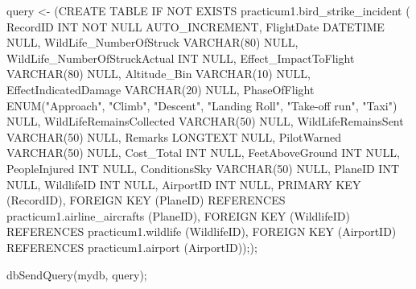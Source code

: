 \documentclass[
]{article}
\newenvironment{Shaded}{\begin{snugshade}}{\end{snugshade}}
\newcommand{\FunctionTok}[1]{\textcolor[rgb]{0.00,0.00,0.00}{#1}}
\newcommand{\NormalTok}[1]{#1}
\newcommand{\OtherTok}[1]{\textcolor[rgb]{0.56,0.35,0.01}{#1}}
\newcommand{\StringTok}[1]{\textcolor[rgb]{0.31,0.60,0.02}{#1}}
\begin{document}
\begin{Shaded}
\begin{Highlighting}[]
\NormalTok{query }\OtherTok{\textless{}{-}}\NormalTok{ (}\StringTok{\textquotesingle{}CREATE TABLE IF NOT EXISTS practicum1.\textasciigrave{}bird\_strike\_incident\textasciigrave{} (}
\StringTok{  \textasciigrave{}RecordID\textasciigrave{} INT NOT NULL AUTO\_INCREMENT,}
\StringTok{  \textasciigrave{}FlightDate\textasciigrave{} DATETIME NULL,}
\StringTok{  \textasciigrave{}WildLife\_NumberOfStruck\textasciigrave{} VARCHAR(80) NULL,}
\StringTok{  \textasciigrave{}WildLife\_NumberOfStruckActual\textasciigrave{} INT NULL,}
\StringTok{  \textasciigrave{}Effect\_ImpactToFlight\textasciigrave{} VARCHAR(80) NULL,}
\StringTok{  \textasciigrave{}Altitude\_Bin\textasciigrave{} VARCHAR(10) NULL,}
\StringTok{  \textasciigrave{}EffectIndicatedDamage\textasciigrave{} VARCHAR(20) NULL,}
\StringTok{  \textasciigrave{}PhaseOfFlight\textasciigrave{} ENUM("Approach", "Climb", "Descent", "Landing Roll", "Take{-}off run", "Taxi") NULL,}
\StringTok{  \textasciigrave{}WildLifeRemainsCollected\textasciigrave{} VARCHAR(50) NULL,}
\StringTok{  \textasciigrave{}WildLifeRemainsSent\textasciigrave{} VARCHAR(50) NULL,}
\StringTok{  \textasciigrave{}Remarks\textasciigrave{} LONGTEXT NULL,}
\StringTok{  \textasciigrave{}PilotWarned\textasciigrave{} VARCHAR(50) NULL,}
\StringTok{  \textasciigrave{}Cost\_Total\textasciigrave{} INT NULL,}
\StringTok{  \textasciigrave{}FeetAboveGround\textasciigrave{} INT NULL,}
\StringTok{  \textasciigrave{}PeopleInjured\textasciigrave{} INT NULL,}
\StringTok{  \textasciigrave{}ConditionsSky\textasciigrave{} VARCHAR(50) NULL,}
\StringTok{  \textasciigrave{}PlaneID\textasciigrave{} INT NULL,}
\StringTok{  \textasciigrave{}WildlifeID\textasciigrave{} INT NULL,}
\StringTok{  \textasciigrave{}AirportID\textasciigrave{} INT NULL,}
\StringTok{  PRIMARY KEY (\textasciigrave{}RecordID\textasciigrave{}),}
\StringTok{  FOREIGN KEY (\textasciigrave{}PlaneID\textasciigrave{}) REFERENCES practicum1.\textasciigrave{}airline\_aircrafts\textasciigrave{} (\textasciigrave{}PlaneID\textasciigrave{}),}
\StringTok{  FOREIGN KEY (\textasciigrave{}WildlifeID\textasciigrave{}) REFERENCES practicum1.\textasciigrave{}wildlife\textasciigrave{} (\textasciigrave{}WildlifeID\textasciigrave{}),}
\StringTok{  FOREIGN KEY (\textasciigrave{}AirportID\textasciigrave{}) REFERENCES practicum1.\textasciigrave{}airport\textasciigrave{} (\textasciigrave{}AirportID\textasciigrave{}));\textquotesingle{}}\NormalTok{);}

\FunctionTok{dbSendQuery}\NormalTok{(mydb, query);}
\end{Highlighting}
\end{Shaded}
\end{document}
